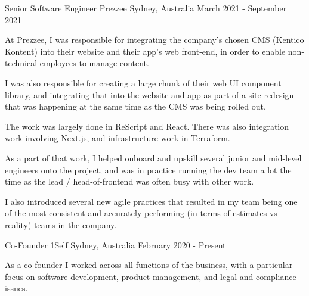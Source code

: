 \begin{cventries}
\cventry
{Senior Software Engineer} %
{Prezzee} %
{Sydney, Australia} %
{March 2021 - September 2021} %
{ %
\begin{cvitems}
\item {At Prezzee, I was responsible for integrating the company's chosen CMS (Kentico Kontent) into their website and their app's web front-end, in order to enable non-technical employees to manage content.}
\item {I was also responsible for creating a large chunk of their web UI component library, and integrating that into the website and app as part of a site redesign that was happening at the same time as the CMS was being rolled out.}
\item {The work was largely done in ReScript and React. There was also integration work involving Next.js, and infrastructure work in Terraform.}
\item {As a part of that work, I helped onboard and upskill several junior and mid-level engineers onto the project, and was in practice running the dev team a lot the time as the lead / head-of-frontend was often busy with other work.}
\item {I also introduced several new agile practices that resulted in my team being one of the most consistent and accurately performing (in terms of estimates vs reality) teams in the company.}
\end{cvitems}
\vspace{2.0mm}
}


\cventry
{Co-Founder} %
{1Self} %
{Sydney, Australia} %
{February 2020 - Present} %
{ %
\begin{cvitems}
\item {As a co-founder I worked across all functions of the business, with a particular focus on software development, product management, and legal and compliance issues.}
\end{cvitems}
\vspace{2.0mm} 
}



\end{cventries}

